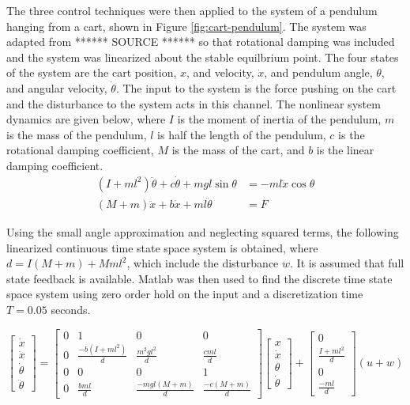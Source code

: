 \documentclass[12 pt]{report}
\begin{document}
The three control techniques were then applied to the system of a pendulum hanging from a cart, shown in Figure \ref{fig:cart-pendulum}. The system was adapted from ****** SOURCE ****** so that rotational damping was included and the system was linearized about the stable equilbrium point. The four states of the system are the cart position, $x$, and velocity, $\dot{x}$, and pendulum angle, $\theta$, and angular velocity, $\dot{\theta}$. The input to the system is the force pushing on the cart and the disturbance to the system acts in this channel. The nonlinear system dynamics are given below, where $I$ is the moment of inertia of the pendulum, $m$ is the mass of the pendulum, $l$ is half the length of the pendulum, $c$ is the rotational damping coefficient, $M$ is the mass of the cart, and $b$ is the linear damping coefficient.
\begin{align*}
(I+ml^2)\ddot{\theta} + c \dot{\theta} + mgl \sin \theta &= -ml \ddot{x} \cos \theta \\
(M+m)\ddot{x} + b\dot{x} + ml \ddot{\theta} &= F
\end{align*}

Using the small angle approximation and neglecting squared terms, the following linearized continuous time state space system is obtained, where $d = I(M+m) + Mml^2$, which include the disturbance $w$. It is assumed that full state feedback is available. Matlab was then used to find the discrete time state space system using zero order hold on the input and a discretization time $T = 0.05$ seconds.

\begin{equation*}
\begin{bmatrix}
\dot{x} \\ \ddot{x} \\ \dot{\theta} \\ \ddot{\theta}
\end{bmatrix} = 
\begin{bmatrix}
0 & 1 & 0 & 0 \\
0 & \frac{-b(I + ml^2)}{d} & \frac{m^2gl^2}{d} & \frac{cml}{d} \\
0 & 0 & 0 & 1 \\
0 & \frac{bml}{d} & \frac{-mgl(M+m)}{d} & \frac{-c(M+m)}{d}
\end{bmatrix}
\begin{bmatrix}
x \\ \dot{x} \\ \theta \\ \dot{\theta}
\end{bmatrix} + 
\begin{bmatrix}
0 \\ \frac{I+ml^2}{d} \\ 0 \\ \frac{-ml}{d}
\end{bmatrix} (u + w)
\end{equation*}
\end{document}
